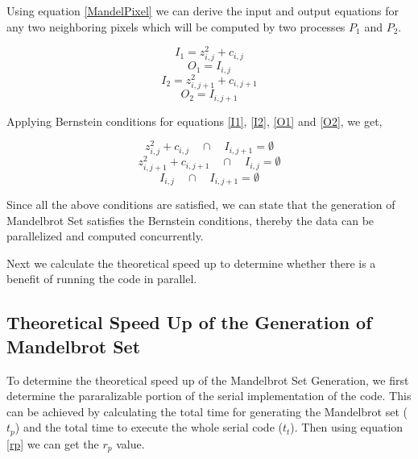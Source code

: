 \documentclass[conference]{IEEEtran}
\begin{document}
			Using equation \ref{MandelPixel} we can derive the input and output equations for any two neighboring pixels which will be computed by two processes $P_{1}$ and $P_{2}$.
			
			\begin{equation}
			I_1 = z_{i,j}^2 + c_{i,j} \label{I1}
			\end{equation}
			\begin{equation}
			O_1 = I_{i,j} \label{O1}
			\end{equation}
			\begin{equation}
			I_2= z_{i,j+1}^2 + c_{i,j+1} \label{I2}
			\end{equation}
			\begin{equation}
			O_2= I_{i,j+1} \label{O2}
			\end{equation}
			
			Applying Bernstein conditions for equations \ref{I1}, \ref{I2}, \ref{O1} and \ref{O2}, we get,
			
			\begin{equation}
			z_{i,j}^2 + c_{i,j}  \quad  \cap \quad I_{i,j+1} = \emptyset
			\end{equation}
			\begin{equation}
			z_{i,j+1}^2 + c_{i,j+1} \quad  \cap \quad I_{i,j} = \emptyset 
			\end{equation}
			\begin{equation}
			I_{i,j}  \quad  \cap \quad  I_{i,j+1} = \emptyset 
			\end{equation}
			
			Since all the above conditions are satisfied, we can state that the generation of Mandelbrot Set satisfies the Bernstein conditions, thereby the data can be parallelized  and computed concurrently. 
			
			Next we calculate the theoretical speed up to determine whether there is a benefit of running the code in parallel.
			
			
			\subsection{Theoretical Speed Up of the Generation of Mandelbrot Set}
			\label{Theo}
			To determine the theoretical speed up of the Mandelbrot Set Generation, we first determine the pararalizable portion of the serial implementation of the code. This can be achieved by calculating the total time for generating the Mandelbrot set ($t_p$) and the total time to execute the whole serial code ($t_t$). Then using equation \ref{rp} we can get the $r_p$ value.
			
\end{document}
